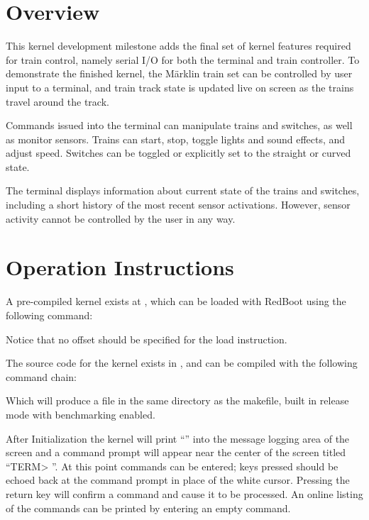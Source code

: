 \documentclass[pdftex,10pt,a4paper]{article}
\begin{document}

\section*{Overview}

This kernel development milestone adds the final set of kernel
features required for train control, namely serial I/O for both
the terminal and train controller. To demonstrate the finished kernel,
the M{\"a}rklin train set can be controlled by user input
to a terminal, and train track state is updated live on screen as the
trains travel around the track.

Commands issued into the terminal can manipulate trains and
switches, as well as monitor sensors. Trains can start, stop, toggle
lights and sound effects, and adjust speed. Switches can be toggled or
explicitly set to the straight or curved state.

The terminal displays information about current state
of the trains and switches, including a short history of the most
recent sensor activations. However, sensor activity cannot be
controlled by the user in any way.


\section*{Operation Instructions}

A pre-compiled kernel exists at
, which can be loaded with
RedBoot using the following command:

\begin{center}
\end{center}

Notice that no offset should be specified for the load instruction.

The source code for the kernel exists in ,
and can be compiled with the following command chain:

\begin{center}
\end{center}

Which will produce a  file in the same directory as
the makefile, built in release mode with benchmarking enabled.

After Initialization the kernel will print
``'' into the message logging area of
the screen and a command prompt will appear near the center of the
screen titled ``TERM> ''. At this point commands can be entered; keys
pressed should be echoed back at the command prompt in place of the
white cursor. Pressing the return key will confirm a command and cause
it to be processed. An online listing of the commands can be printed
by entering an empty command.
\end{document}

